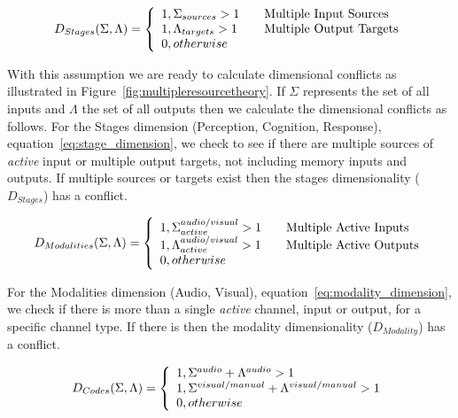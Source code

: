 \begin{equation}
D_{Stages}(\Sigma, \Lambda) = \left\{ 
  \begin{array}{l l}
    1, \Sigma_{sources} > 1 & \quad \text{Multiple Input Sources}\\
    1, \Lambda_{targets} > 1 & \quad \text{Multiple Output Targets}\\
    0, otherwise
  \end{array}
  \right.
  \label{eq:stage_dimension}
\end{equation}

With this assumption we are ready to calculate dimensional conflicts as illustrated in Figure~\ref{fig:multipleresourcetheory}.  If $\Sigma$ represents the set of all inputs and $\Lambda$ the set of all outputs then we calculate the dimensional conflicts as follows.  For the Stages dimension (Perception, Cognition, Response), equation~\ref{eq:stage_dimension}, we check to see if there are multiple sources of {\em active} input or multiple output targets, not including memory inputs and outputs.  If multiple sources or targets exist then the stages dimensionality ($D_{Stages}$) has a conflict.

\begin{equation}
D_{Modalities}(\Sigma, \Lambda) = \left\{ 
  \begin{array}{l l}
    1, \Sigma_{active}^{audio/visual} > 1 & \quad \text{Multiple Active Inputs}\\
    1, \Lambda_{active}^{audio/visual} > 1 & \quad \text{Multiple Active Outputs}\\
    0, otherwise
  \end{array}
  \right.
  \label{eq:modality_dimension}
\end{equation}

For the Modalities dimension (Audio, Visual), equation~\ref{eq:modality_dimension}, we check if there is more than a single {\em active} channel, input or output, for a specific channel type.  If there is then the modality dimensionality ($D_{Modality}$) has a conflict.

\begin{equation}
D_{Codes}(\Sigma, \Lambda) = \left\{ 
  \begin{array}{l l}
    1, \Sigma^{audio} + \Lambda^{audio} > 1\\
    1, \Sigma^{visual/manual} + \Lambda^{visual/manual} > 1\\
    0, otherwise
  \end{array}
  \right.
  \label{eq:codes_dimension}
\end{equation}


